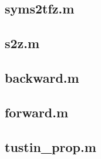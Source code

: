     \subsection*{syms2tfz.m}
    \label{subsec:syms2tfz}
    
    
    \subsection*{s2z.m}
    \label{subsec:s2z}
    
    
    \subsection*{backward.m}
    \label{subsec:backward}
    
    
    \subsection*{forward.m}
    \label{subsec:forward}
    
    
    \subsection*{tustin\_prop.m}
    \label{subsec:tustin}
    